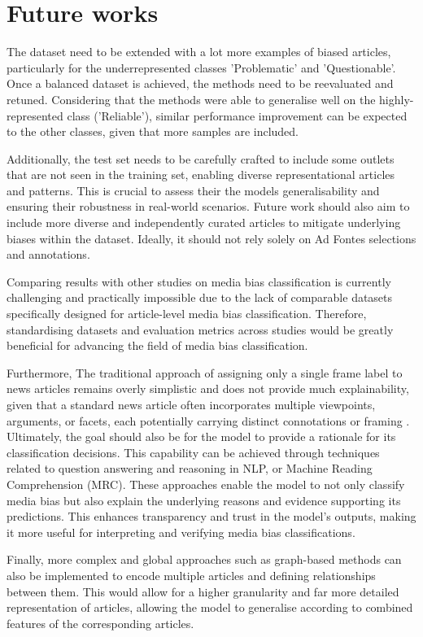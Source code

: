 \section{Future works}

The dataset need to be extended with a lot more examples of biased articles, particularly for the underrepresented classes 'Problematic' and 'Questionable'. Once a balanced dataset is achieved, the methods need to be reevaluated and retuned. Considering that the methods were able to generalise well on the highly-represented class ('Reliable'), similar performance improvement can be expected to the other classes, given that more samples are included.

Additionally, the test set needs to be carefully crafted to include some outlets that are not seen in the training set, enabling diverse representational articles and patterns. This is crucial to assess their the models generalisability and ensuring their robustness in real-world scenarios. Future work should also aim to include more diverse and independently curated articles to mitigate underlying biases within the dataset. Ideally, it should not rely solely on Ad Fontes selections and annotations.

Comparing results with other studies on media bias classification is currently challenging and practically impossible due to the lack of comparable datasets specifically designed for article-level media bias classification. Therefore, standardising datasets and evaluation metrics across studies would be greatly beneficial for advancing the field of media bias classification.

Furthermore, The traditional approach of assigning only a single frame label to news articles remains overly simplistic and does not provide much explainability, given that a standard news article often incorporates multiple viewpoints, arguments, or facets, each potentially carrying distinct connotations or framing \cite{vallejo-2023-connecting}. Ultimately, the goal should also be for the model to provide a rationale for its classification decisions. This capability can be achieved through techniques related to question answering and reasoning in NLP, or Machine Reading Comprehension (MRC). These approaches enable the model to not only classify media bias but also explain the underlying reasons and evidence supporting its predictions. This enhances transparency and trust in the model's outputs, making it more useful for interpreting and verifying media bias classifications.

Finally, more complex and global approaches such as graph-based methods can also be implemented to encode multiple articles and defining relationships between them. This would allow for a higher granularity and far more detailed representation of articles, allowing the model to generalise according to combined features of the corresponding articles.



